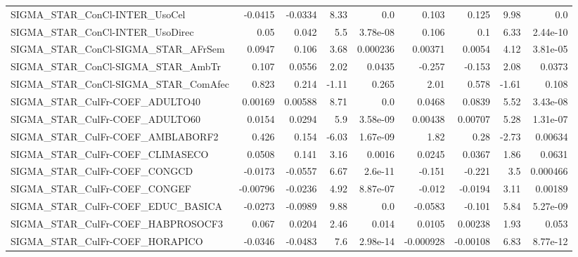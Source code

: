 \begin{tabular}{lrrrrrrrr}
SIGMA\_STAR\_ConCl-INTER\_UsoCel          &     -0.0415 &      -0.0334 &    8.33 &      0.0 &      0.103 &       0.125 &         9.98 &           0.0 \\
SIGMA\_STAR\_ConCl-INTER\_UsoDirec        &        0.05 &        0.042 &     5.5 & 3.78e-08 &      0.106 &         0.1 &         6.33 &      2.44e-10 \\
SIGMA\_STAR\_ConCl-SIGMA\_STAR\_AFrSem     &      0.0947 &        0.106 &    3.68 & 0.000236 &    0.00371 &      0.0054 &         4.12 &      3.81e-05 \\
SIGMA\_STAR\_ConCl-SIGMA\_STAR\_AmbTr      &       0.107 &       0.0556 &    2.02 &   0.0435 &     -0.257 &      -0.153 &         2.08 &        0.0373 \\
SIGMA\_STAR\_ConCl-SIGMA\_STAR\_ComAfec    &       0.823 &        0.214 &   -1.11 &    0.265 &       2.01 &       0.578 &        -1.61 &         0.108 \\
SIGMA\_STAR\_CulFr-COEF\_ADULTO40         &     0.00169 &      0.00588 &    8.71 &      0.0 &     0.0468 &      0.0839 &         5.52 &      3.43e-08 \\
SIGMA\_STAR\_CulFr-COEF\_ADULTO60         &      0.0154 &       0.0294 &     5.9 & 3.58e-09 &    0.00438 &     0.00707 &         5.28 &      1.31e-07 \\
SIGMA\_STAR\_CulFr-COEF\_AMBLABORF2       &       0.426 &        0.154 &   -6.03 & 1.67e-09 &       1.82 &        0.28 &        -2.73 &       0.00634 \\
SIGMA\_STAR\_CulFr-COEF\_CLIMASECO        &      0.0508 &        0.141 &    3.16 &   0.0016 &     0.0245 &      0.0367 &         1.86 &        0.0631 \\
SIGMA\_STAR\_CulFr-COEF\_CONGCD           &     -0.0173 &      -0.0557 &    6.67 &  2.6e-11 &     -0.151 &      -0.221 &          3.5 &      0.000466 \\
SIGMA\_STAR\_CulFr-COEF\_CONGEF           &    -0.00796 &      -0.0236 &    4.92 & 8.87e-07 &     -0.012 &     -0.0194 &         3.11 &       0.00189 \\
SIGMA\_STAR\_CulFr-COEF\_EDUC\_BASICA      &     -0.0273 &      -0.0989 &    9.88 &      0.0 &    -0.0583 &      -0.101 &         5.84 &      5.27e-09 \\
SIGMA\_STAR\_CulFr-COEF\_HABPROSOCF3      &       0.067 &       0.0204 &    2.46 &    0.014 &     0.0105 &     0.00238 &         1.93 &         0.053 \\
SIGMA\_STAR\_CulFr-COEF\_HORAPICO         &     -0.0346 &      -0.0483 &     7.6 & 2.98e-14 &  -0.000928 &    -0.00108 &         6.83 &      8.77e-12 \\

\end{tabular}
